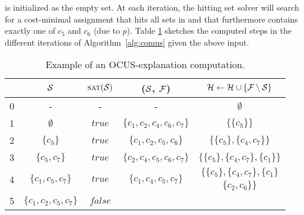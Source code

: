 \begin{example}
	 
\setstohit is initialized as the empty set. At each iteration, the hitting set solver will search for a cost-minimal assignment that hits all sets in \setstohit and that furthermore contains exactly one of $c_5$ and $c_6$ (due to $p$).
	Table \ref{tab:explanation-steps-expanded} sketches the computed steps in the different iterations of Algorithm~\ref{alg:comus} given the above input.
\begin{table}[!h]
	\centering
	\begin{adjustbox}{max width=\columnwidth}
			\begin{tabular}{lcccc} %
				&$\mathcal{S}$ & $\textsc{sat}(\mathcal{S})$ & \grow($\mathcal{S}$, $\mathcal{F} $) & $\mathcal{H}  \gets \mathcal{H}  \cup \{  \mathcal{F}  \setminus \mathcal{S}\}$\\ 
				\midrule
				0 & - &  -&-  & \rule{0pt}{2ex} $\emptyset$  \\
				1 &$ \emptyset $ & $true$ & $\{c_1, c_2, c_4, c_6, c_7\}$    & $\{ \{c_5\}\}$   \\
				2 &$\{ c_5\}$  & $true$ & $\{ c_1, c_2, c_5, c_6\}$   & $\{ \{c_5\}, \{c_4, c_7\}\}$  \\  
				3& $\{ c_5,c_7 \}$  & $true$ & $\{c_2, c_4, c_5, c_6,c_7 \}$  & $\{ \{c_5\},\{c_4, c_7\}, \{c_1\}\}$  \\  
				\multirow{2}{*}{4}& \multirow{2}{*}{$\{ c_1, c_5,c_7 \}$}  & \multirow{2}{*}{$true$} & \multirow{2}{*}{$\{c_1, c_4, c_5,c_7 \}$}  & $\{ \{c_5\},\{c_4, c_7\}, \{c_1\}$  \\ 
				& &  &  & $\{c_2, c_6\}\}$  \\   
				5&  $\{ c_1, c_2, c_5, c_7 \}$ & $false$ & & \\
			\end{tabular}
	\end{adjustbox}
	\caption{Example of an OCUS-explanation computation.}
	\label{tab:explanation-steps-expanded}
\end{table}
\end{example}

